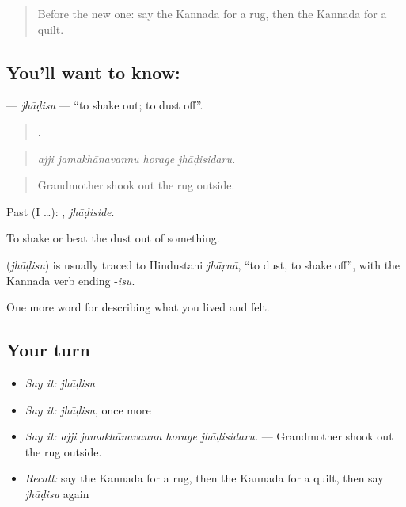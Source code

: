 \label{lesson:KA-C545-jhadisu}



\begin{quote}
Before the new one: say the Kannada for a rug, then the Kannada for a quilt.
\end{quote}

\subsection*{You'll want to know: }
\textbf{} — \emph{jhāḍisu} — \textquotedblleft{}to shake out; to dust off\textquotedblright{}.

\begin{quote}
   .
\end{quote}

\begin{quote}
\emph{ajji jamakhānavannu horage jhāḍisidaru.}
\end{quote}

\begin{quote}
Grandmother shook out the rug outside.
\end{quote}

Past (I …): , \emph{jhāḍiside}.

To shake or beat the dust out of something.

\begin{cousinweb}
\textbf{} (\emph{jhāḍisu}) is usually traced to Hindustani \emph{jhāṛnā}, \textquotedblleft{}to dust, to shake off\textquotedblright{}, with the Kannada verb ending -\emph{isu}.
\end{cousinweb}

\begin{grammarlens}[title={What you've built}]
One more word for describing what you lived and felt.
\end{grammarlens}

\subsection*{Your turn}
\begin{itemize}
\raggedright
  \item \emph{Say it:} \emph{jhāḍisu}
  \item \emph{Say it:} \emph{jhāḍisu}, once more
  \item \emph{Say it:} \emph{ajji jamakhānavannu horage jhāḍisidaru.} — Grandmother shook out the rug outside.
  \item \emph{Recall:} say the Kannada for a rug, then the Kannada for a quilt, then say \emph{jhāḍisu} again
\end{itemize}

